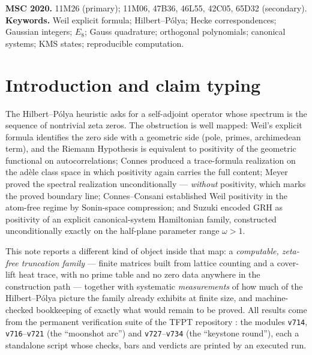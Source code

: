 \documentclass[11pt,a4paper]{article}
\theoremstyle{remark}
\begin{document}
\medskip
\noindent\textbf{MSC 2020.} 11M26 (primary); 11M06, 47B36, 46L55,
42C05, 65D32 (secondary).\\
\textbf{Keywords.} Weil explicit formula; Hilbert--P\'olya;
Hecke correspondences; Gaussian integers; $E_8$; Gauss quadrature;
orthogonal polynomials; canonical systems; KMS states;
reproducible computation.

\section{Introduction and claim typing}\label{sec:intro}

The Hilbert--P\'olya heuristic asks for a self-adjoint operator whose
spectrum is the sequence of nontrivial zeta zeros.  The obstruction
is well mapped: Weil's explicit formula \cite{Weil52} identifies the
zero side with a geometric side (pole, primes, archimedean term), and
the Riemann Hypothesis is equivalent to positivity of the geometric
functional on autocorrelations; Connes \cite{Connes99} produced a
trace-formula realization on the ad\`ele class space in which
positivity again carries the full content; Meyer \cite{Meyer05}
proved the spectral realization unconditionally --- \emph{without}
positivity, which marks the proved boundary line; Connes--Consani
\cite{CC21} established Weil positivity in the atom-free regime by
Sonin-space compression; and Suzuki \cite{Suzuki21} encoded GRH as
positivity of an explicit canonical-system Hamiltonian family,
constructed unconditionally exactly on the half-plane parameter range
$\omega>1$.

This note reports a different kind of object inside that map: a
\emph{computable, zeta-free truncation family} --- finite matrices
built from lattice counting and a cover-lift heat trace, with no
prime table and no zero data anywhere in the construction path ---
together with systematic \emph{measurements} of how much of the
Hilbert--P\'olya picture the family already exhibits at finite size,
and machine-checked bookkeeping of exactly what would remain to be
proved.  All results come from the permanent verification suite of
the TFPT repository \cite{TFPT}: the modules \texttt{v714},
\texttt{v716}--\texttt{v721} (the ``moonshot arc'') and
\texttt{v727}--\texttt{v734} (the ``keystone round''), each a
standalone script whose checks, bars and verdicts are printed by an
executed run.
\end{document}
